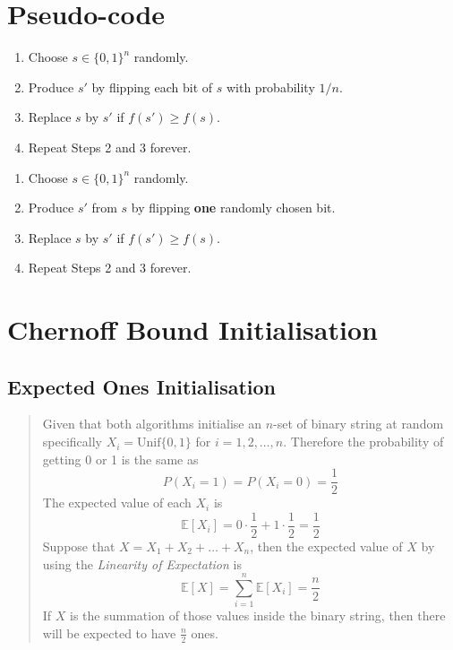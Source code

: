 \documentclass[a4paper, 12pt]{article}
\begin{document}
\section{Pseudo-code}
\begin{tcolorbox}[title={(1+1) EA}, colback=black!10, colframe=black!70, fonttitle=\bfseries]
    \begin{enumerate}
        \item Choose $s \in \{0,1\}^n$ randomly.
        \item Produce $s'$ by flipping each bit of $s$ with probability $1/n$.
        \item Replace $s$ by $s'$ if $f(s') \geq f(s)$.
        \item Repeat Steps 2 and 3 forever.
    \end{enumerate}
\end{tcolorbox}
\begin{tcolorbox}[title={RLS}, colback=black!10, colframe=black!70, fonttitle=\bfseries]
    \begin{enumerate}
        \item Choose $s \in \{0,1\}^n$ randomly.
        \item Produce $s'$ from $s$ by flipping \textbf{one} randomly chosen bit.
        \item Replace $s$ by $s'$ if $f(s') \geq f(s)$.
        \item Repeat Steps 2 and 3 forever.
    \end{enumerate}
\end{tcolorbox}
\section{Chernoff Bound Initialisation}
    \subsection{Expected Ones Initialisation}
        \begin{quote}
            Given that both algorithms initialise an $n$-set of binary string at random specifically $X_i = \text{Unif}\{0,1\}$ for $i = 1,2,\ldots,n$. Therefore the 
            probability of getting 0 or 1 is the same as
            \begin{equation*}
                P(X_i = 1) = P(X_i = 0) = \frac{1}{2}
            \end{equation*}
            The expected value of each $X_i$ is 
            \begin{equation*}
                \mathbb{E}[X_i] = 0\cdot\frac{1}{2} + 1\cdot\frac{1}{2} = \frac{1}{2}
            \end{equation*}
            Suppose that $X = X_1 + X_2 + \ldots + X_n$, then the expected value of $X$ by using the \emph{Linearity of Expectation} is
            \begin{equation*}
                \mathbb{E}[X] = \sum_{i=1}^{n}\mathbb{E}[X_i] = \frac{n}{2}
            \end{equation*}  
            If $X$ is the summation of those values inside the binary string, then there will be expected to have $\frac{n}{2}$ ones.
        \end{quote}
\end{document}
